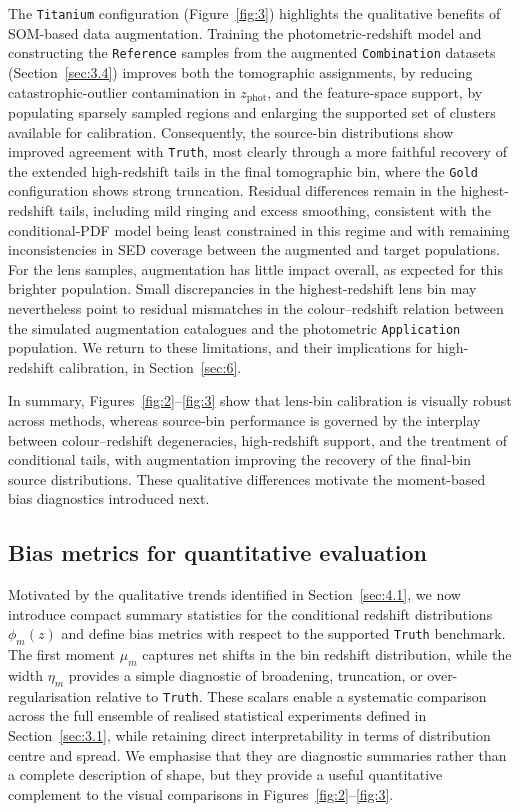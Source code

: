 The \texttt{Titanium} configuration (Figure~\ref{fig:3}) highlights the qualitative benefits of SOM-based data augmentation. Training the photometric-redshift model and constructing the \texttt{Reference} samples from the augmented \texttt{Combination} datasets (Section~\ref{sec:3.4}) improves both the tomographic assignments, by reducing catastrophic-outlier contamination in \(z_{\text{phot}}\), and the feature-space support, by populating sparsely sampled regions and enlarging the supported set of clusters available for calibration. Consequently, the source-bin distributions show improved agreement with \texttt{Truth}, most clearly through a more faithful recovery of the extended high-redshift tails in the final tomographic bin, where the \texttt{Gold} configuration shows strong truncation. Residual differences remain in the highest-redshift tails, including mild ringing and excess smoothing, consistent with the conditional-PDF model being least constrained in this regime and with remaining inconsistencies in SED coverage between the augmented and target populations. For the lens samples, augmentation has little impact overall, as expected for this brighter population. Small discrepancies in the highest-redshift lens bin may nevertheless point to residual mismatches in the colour--redshift relation between the simulated augmentation catalogues and the photometric \texttt{Application} population. We return to these limitations, and their implications for high-redshift calibration, in Section~\ref{sec:6}.

In summary, Figures~\ref{fig:2}--\ref{fig:3} show that lens-bin calibration is visually robust across methods, whereas source-bin performance is governed by the interplay between colour--redshift degeneracies, high-redshift support, and the treatment of conditional tails, with augmentation improving the recovery of the final-bin source distributions. These qualitative differences motivate the moment-based bias diagnostics introduced next.

\subsection{Bias metrics for quantitative evaluation} \label{sec:4.2}

Motivated by the qualitative trends identified in Section~\ref{sec:4.1}, we now introduce compact summary statistics for the conditional redshift distributions \(\phi_m(z)\) and define bias metrics with respect to the supported \texttt{Truth} benchmark. The first moment \(\mu_m\) captures net shifts in the bin redshift distribution, while the width \(\eta_m\) provides a simple diagnostic of broadening, truncation, or over-regularisation relative to \texttt{Truth}. These scalars enable a systematic comparison across the full ensemble of realised statistical experiments defined in Section~\ref{sec:3.1}, while retaining direct interpretability in terms of distribution centre and spread. We emphasise that they are diagnostic summaries rather than a complete description of shape, but they provide a useful quantitative complement to the visual comparisons in Figures~\ref{fig:2}--\ref{fig:3}.

